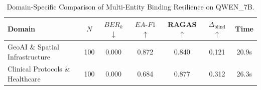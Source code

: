 \begin{table}[t]
\centering
\small
\caption{Domain-Specific Comparison of Multi-Entity Binding Resilience on QWEN_7B.}
\label{tab:domain_breakdown_qwen_7b}
\begin{tabular}{lcccccc}
\toprule
\textbf{Domain} & \textbf{$N$} & \textbf{$BER_k$ $\downarrow$} & \textbf{$EA\text{-}F1$ $\uparrow$} & \textbf{RAGAS $\uparrow$} & \textbf{$\Delta_{\text{blind}}$ $\uparrow$} & \textbf{Time} \\
\midrule
  GeoAI \& Spatial Infrastructure & 100 & 0.000 & 0.872 & 0.840 & 0.121 & 20.9s \\
  Clinical Protocols \& Healthcare & 100 & 0.000 & 0.684 & 0.877 & 0.312 & 26.3s \\
\bottomrule
\end{tabular}
\end{table}
